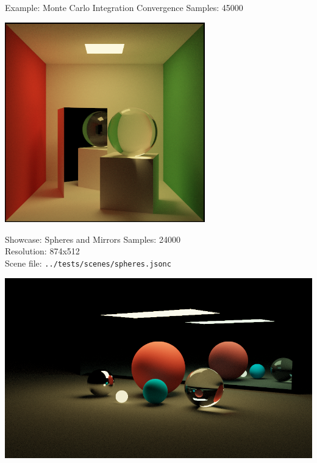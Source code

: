 \documentclass{beamer}
\begin{document}
\begin{frame}{Example: Monte Carlo Integration Convergence}
    Samples: 45000
    \begin{center}
        \includegraphics[width=0.65\textwidth]{../img/convergence/cornell-45000.png}
    \end{center}
\end{frame}

\begin{frame}{Showcase: Spheres and Mirrors}
    \footnotesize{
    Samples: 24000\\
    Resolution: 874x512\\
    Scene file: \texttt{../tests/scenes/spheres.jsonc}
    }
    \begin{center}
        \includegraphics[width=1.00\textwidth]{../img/spheres.png}
    \end{center}
\end{frame}
\end{document}
